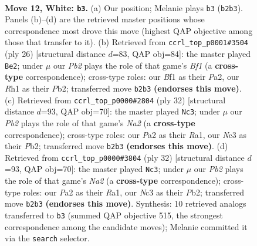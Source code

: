 \documentclass[11pt]{article}
\begin{document}
\clearpage

\begin{figure}[p]\centering
\begin{subfigure}{0.46\textwidth}\centering
\resizebox{\linewidth}{!}{%
\newchessgame
\chessboard[
  setfen={r3k2r/ppp1bppp/2bpqn2/8/4P1P1/2NQBP2/PPP4P/2KR1B1R w kq - 5 12},
  showmover=false,
  pgfstyle=straightmove, color=movearrow, markmove={b2-b3}
]}
\caption{}
\end{subfigure}\hfill
\begin{subfigure}{0.46\textwidth}\centering
\resizebox{\linewidth}{!}{%
\newchessgame
\chessboard[
  setfen={r1b1k2r/1p2ppb1/p1qp1n1p/6p1/4P3/2N2QBP/PPP2PP1/2KR1B1R w kq - 0 14},
  showmover=false,
  pgfstyle=straightmove, color=movearrow, markmove={f1-e2}
]}
\caption{}
\end{subfigure}
\\[4pt]
\begin{subfigure}{0.46\textwidth}\centering
\resizebox{\linewidth}{!}{%
\newchessgame
\chessboard[
  setfen={r3k2r/1b2bp1p/pq1ppnp1/8/P3P3/1N1Q4/NPP2PPP/R1B2RK1 w kq - 1 17},
  showmover=false,
  pgfstyle=straightmove, color=movearrow, markmove={a2-c3}
]}
\caption{}
\end{subfigure}\hfill
\begin{subfigure}{0.46\textwidth}\centering
\resizebox{\linewidth}{!}{%
\newchessgame
\chessboard[
  setfen={r3k2r/1b2bp1p/pq1ppnp1/8/P3P3/1N1Q4/NPP2PPP/R1B2RK1 w kq - 1 17},
  showmover=false,
  pgfstyle=straightmove, color=movearrow, markmove={a2-c3}
]}
\caption{}
\end{subfigure}
\caption{\textbf{Move 12, White: \texttt{b3}.} (a) Our position; Melanie plays \texttt{b3} (\texttt{b2b3}). Panels (b)--(d) are the retrieved master positions whose correspondence most drove this move (highest QAP objective among those that transfer to it). (b) Retrieved from \texttt{ccrl\_top\_p0001\#3504} (ply 26) [structural distance $d$=83, QAP obj=84]: the master played \texttt{Be2}; under $\mu$ our \emph{Pb2} plays the role of that game's \emph{Bf1} (a \textbf{cross-type} correspondence); cross-type roles: our \emph{B}f1 as their \emph{P}a2, our \emph{R}h1 as their \emph{P}b2; transferred move \texttt{b2b3} \textbf{(endorses this move)}. (c) Retrieved from \texttt{ccrl\_top\_p0000\#2804} (ply 32) [structural distance $d$=93, QAP obj=70]: the master played \texttt{Nc3}; under $\mu$ our \emph{Pb2} plays the role of that game's \emph{Na2} (a \textbf{cross-type} correspondence); cross-type roles: our \emph{P}a2 as their \emph{R}a1, our \emph{N}c3 as their \emph{P}b2; transferred move \texttt{b2b3} \textbf{(endorses this move)}. (d) Retrieved from \texttt{ccrl\_top\_p0000\#3804} (ply 32) [structural distance $d$=93, QAP obj=70]: the master played \texttt{Nc3}; under $\mu$ our \emph{Pb2} plays the role of that game's \emph{Na2} (a \textbf{cross-type} correspondence); cross-type roles: our \emph{P}a2 as their \emph{R}a1, our \emph{N}c3 as their \emph{P}b2; transferred move \texttt{b2b3} \textbf{(endorses this move)}. Synthesis: 10 retrieved analogs transferred to \texttt{b3} (summed QAP objective 515, the strongest correspondence among the candidate moves); Melanie committed it via the \texttt{search} selector.}
\label{fig:thought-m22}
\end{figure}
\end{document}
